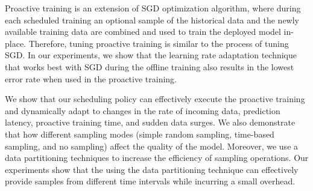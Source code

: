 Proactive training is an extension of SGD optimization algorithm, where during each scheduled training an optional sample of the historical data and the newly available training data are combined and used to train the deployed model in-place.
Therefore, tuning proactive training is similar to the process of tuning SGD.
In our experiments, we show that the learning rate adaptation technique that works best with SGD during the offline training also results in the lowest error rate when used in the proactive training.

We show that our scheduling policy can effectively execute the proactive training and dynamically adapt to changes in the rate of incoming data, prediction latency, proactive training time, and sudden data surges.
We also demonstrate that how different sampling modes (simple random sampling, time-based sampling, and no sampling) affect the quality of the model.
Moreover, we use a data partitioning techniques to increase the efficiency of sampling operations.
Our experiments show that the using the data partitioning technique can effectively provide samples from different time intervals while incurring a small overhead.




